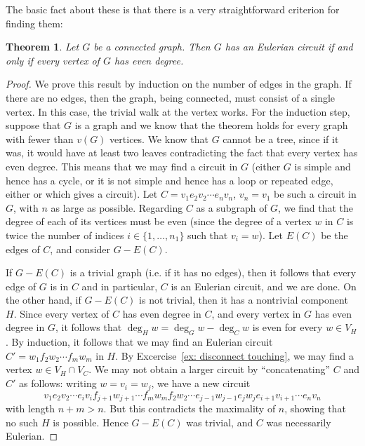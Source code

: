 \documentclass[12pt]{report}
\theoremstyle{plain}
\newtheorem{thm}{Theorem}[section]
\begin{document}
The basic fact about these is that there is a very straightforward
criterion for finding them:
\begin{thm} \label{euler criterion}
Let $G$ be a connected graph. Then $G$ has an Eulerian circuit if and only
if every vertex of $G$ has even degree.
\end{thm}
\begin{proof}
We prove this result by induction on the number of edges in the graph.
If there are no edges, then the graph, being connected, must consist of a
single vertex. In this case, the trivial walk at the vertex works. For
the induction step, suppose that $G$ is a graph and we know that the
theorem holds for every graph with fewer than $v(G)$ vertices. We know that
$G$ cannot be a tree, since if it was, it would have at least two leaves
contradicting the fact that every vertex has even degree. This means that
we may find a circuit in $G$ (either $G$ is simple and hence has a cycle,
or it is not simple and hence has a loop or repeated edge, either or which
gives a circuit). Let $C = v_1 e_2 v_2 \cdots e_n v_n$, $v_n = v_1$ be such
a circuit in $G$, with $n$ as large as possible. Regarding $C$ as a
subgraph of $G$, we find that the degree of each of its vertices must be
even (since the degree of a vertex $w$ in $C$ is twice the number of
indices $i \in \{1, \ldots, n_1\}$ such that $v_i = w$). Let $E(C)$ be the
edges of $C$, and consider $G - E(C)$.

If $G - E(C)$ is a trivial graph (i.e. if it has no edges), then it follows
that every edge of $G$ is in $C$ and in particular, $C$ is an Eulerian
circuit, and we are done. On the other hand, if $G - E(C)$ is not trivial,
then it has a nontrivial component $H$. Since every vertex of $C$ has even
degree in $C$, and every vertex in $G$ has even degree in $G$, it follows
that $\deg_H w = \deg_G w - \deg_C w$ is even for every $w \in V_H$. By
induction, it follows that we may find an Eulerian circuit $C' = w_1 f_2
w_2 \cdots f_m w_m$ in $H$. By Excercise~\ref{ex: disconnect touching}, we
may find a vertex $w \in V_H \cap V_C$. We may not obtain a larger circuit
by ``concatenating'' $C$ and $C'$ as follows: writing $w = v_i = w_j$, we
have a new circuit 
\[v_1 e_2 v_2 \cdots e_i v_i f_{j+1} w_{j+1} \cdots f_m
w_m f_2 w_2 \cdots e_{j-1} w_{j-1} e_j w_j e_{i+1} v_{i+1} \cdots e_n v_n\]
with length $n + m > n$. But this contradicts the maximality of $n$,
showing that no such $H$ is possible. Hence $G - E(C)$ was trivial, and $C$
was necessarily Eulerian.
\end{proof}
\end{document}
